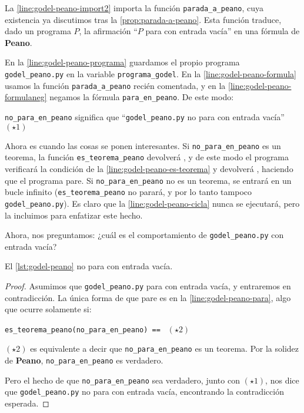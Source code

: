La \cref{line:godel-peano-import2} importa la función \texttt{parada\_a\_peano}, cuya existencia ya discutimos tras la \cref{prop:parada-a-peano}. Esta función traduce, dado un programa $P$, la afirmación ``$P$ para con entrada vacía'' en una fórmula de \textbf{Peano}.

En la \cref{line:godel-peano-programa} guardamos el propio programa \texttt{godel\_peano.py} en la variable \texttt{programa\_godel}. En la \cref{line:godel-peano-formula} usamos la función \texttt{parada\_a\_peano} recién comentada, y en la \cref{line:godel-peano-formulaneg} negamos la fórmula \texttt{para\_en\_peano}. De este modo:
\begin{adjustwidth}{30pt}{}
    \texttt{no\_para\_en\_peano} significa que ``\texttt{godel\_peano.py} no para con entrada vacía'' \hfill $(\star1)$
\end{adjustwidth}
Ahora es cuando las cosas se ponen interesantes. Si \texttt{no\_para\_en\_peano} es un teorema, la función \texttt{es\_teorema\_peano} devolverá , y de este modo el programa verificará la condición de la \cref{line:godel-peano-es-teorema} y devolverá , haciendo que el programa pare. Si \texttt{no\_para\_en\_peano} no es un teorema, se entrará en un bucle infinito (\texttt{es\_teorema\_peano} no parará, y por lo tanto tampoco \texttt{godel\_peano.py}). Es claro que la \cref{line:godel-peano-cicla} nunca se ejecutará, pero la incluimos para enfatizar este hecho.

Ahora, nos preguntamos: ¿cuál es el comportamiento de \texttt{godel\_peano.py} con entrada vacía?

\begin{proposicion}\label{prop:godel-peano-no-para}
El \cref{lst:godel-peano} no para con entrada vacía.
\end{proposicion}
\begin{proof}
Asumimos que \texttt{godel\_peano.py} para con entrada vacía, y entraremos en contradicción. La única forma de que pare es en la \cref{line:godel-peano-para}, algo que ocurre solamente si:
\begin{adjustwidth}{30pt}{}
    \texttt{es\_teorema\_peano(no\_para\_en\_peano) == } \hfill $(\star2)$
\end{adjustwidth}
$(\star2)$ es equivalente a decir que \texttt{no\_para\_en\_peano} es un teorema. Por la solidez de \textbf{Peano}, \texttt{no\_para\_en\_peano} es verdadero.

Pero el hecho de que \texttt{no\_para\_en\_peano} sea verdadero, junto con $(\star1)$, nos dice que \texttt{godel\_peano.py} no para con entrada vacía, encontrando la contradicción esperada.
\end{proof}

